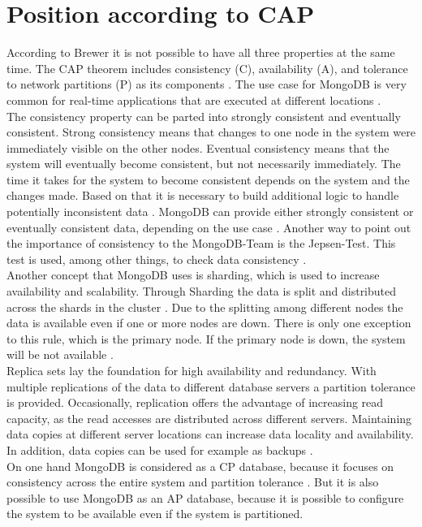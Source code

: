 
\section{Position according to CAP}

According to Brewer it is not possible to have all three properties at the same time.
The CAP theorem includes consistency (C), availability (A), and tolerance to network partitions (P) as its components \parencite{Brewer2000}.
The use case for MongoDB is very common for real-time applications that are executed at different locations \parencite{Jayasekara2021}.
\\
The consistency property can be parted into strongly consistent and eventually consistent. 
Strong consistency means that changes to one node in the system were immediately visible on the other nodes.
Eventual consistency means that the system will eventually become consistent, but not necessarily immediately. 
The time it takes for the system to become consistent depends on the system and the changes made.
Based on that it is necessary to build additional logic to handle potentially inconsistent data \parencite[pp. 4-5]{MongoDB2018}.
MongoDB can provide either strongly consistent or eventually consistent data, depending on the use case \parencite[p. 5]{MongoDB2018}.
Another way to point out the importance of consistency to the MongoDB-Team is the Jepsen-Test.
This test is used, among other things, to check data consistency \parencite{Mongo-Jepsen}.
\\
Another concept that MongoDB uses is sharding, which is used to increase availability and scalability. 
Through Sharding the data is split and distributed across the shards in the cluster \parencites{Mongo-Sharding}[p. 7]{Membrey2014}.
Due to the splitting among different nodes the data is available even if one or more nodes are down. 
There is only one exception to this rule, which is the primary node. If the primary node is down, the system will be not available \parencites{Mongo-Sharding}. 
\\
Replica sets lay the foundation for high availability and redundancy. With multiple replications of the data to different database servers a partition tolerance is provided.
Occasionally, replication offers the advantage of increasing read capacity, as the read accesses are distributed across different servers.
Maintaining data copies at different server locations can increase data locality and availability. In addition, data copies can be used for example as backups \parencite{Mongo-Replication}.
\\
On one hand MongoDB is considered as a CP database, because it focuses on consistency across the entire system and partition tolerance \parencite{Jayasekara2021}.
But it is also possible to use MongoDB as an AP database, because it is possible to configure the system to be available even if the system is partitioned.

